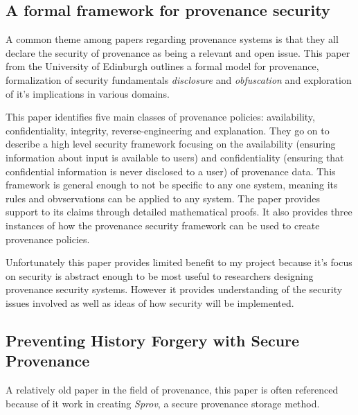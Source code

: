 \subsection{A formal framework for provenance security\cite{Cheney2011}}
\label{sub:a_formal_framework_for_provenance_securitycheney2011}

A common theme among papers regarding provenance systems is that they all declare the security of provenance as being a relevant and open issue. This paper from the University of Edinburgh outlines a formal model for provenance, formalization of security fundamentals \textit{disclosure} and \textit{obfuscation} and exploration of it's implications in various domains.

This paper identifies five main classes of provenance policies: availability, confidentiality, integrity, reverse-engineering and explanation. They go on to describe a high level security framework focusing on the availability (ensuring information about input is available to users) and confidentiality (ensuring that confidential information is never disclosed to a user) of provenance data. This framework is general enough to not be specific to any one system, meaning its rules and obvservations can be applied to any system. The paper provides support to its claims through detailed mathematical proofs. It also provides three instances of how the provenance security framework can be used to create provenance policies.

Unfortunately this paper provides limited benefit to my project because it's focus on security is abstract enough to be most useful to researchers designing provenance security systems. However it provides understanding of the security issues involved as well as ideas of how security will be implemented. 

\subsection{Preventing History Forgery with Secure Provenance\cite{Hasan2009}}
\label{sub:the_case_of_the_fake_picasso_preventing_history_forgery_with_secure_provenance}

A relatively old paper in the field of provenance, this paper is often referenced because of it work in creating \textit{Sprov}, a secure provenance storage method. 


